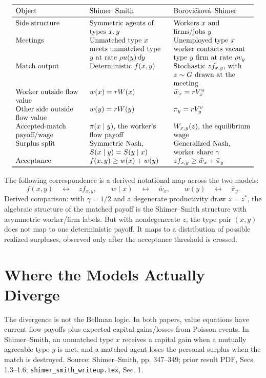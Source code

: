 \documentclass[11pt]{article}
\begin{document}
\[
\begin{array}{>{\raggedright\arraybackslash}p{0.27\linewidth}
                >{\raggedright\arraybackslash}p{0.31\linewidth}
                >{\raggedright\arraybackslash}p{0.31\linewidth}}
\toprule
Object & Shimer--Smith & Borovi\v{c}kov\'a--Shimer \\
\midrule
Side structure & Symmetric agents of types $x,y$ & Workers $x$ and firms/jobs $y$ \\
Meetings & Unmatched type $x$ meets unmatched type $y$ at rate
$\rho u(y)\,dy$ & Unemployed type $x$ worker contacts vacant type $y$ firm at
rate $\rho v_y$ \\
Match output & Deterministic $f(x,y)$ & Stochastic $z f_{x,y}$, with $z\sim G$ drawn at the meeting \\
Worker outside flow value & $w(x)=rW(x)$ & $\bar w_x=rV_x^u$ \\
Other side outside flow value & $w(y)=rW(y)$ & $\bar\pi_y=rV_y^v$ \\
Accepted-match payoff/wage & $\pi(x\mid y)$, the worker's flow payoff & $W_{x,y}(z)$, the equilibrium wage \\
Surplus split & Symmetric Nash, $S(x\mid y)=S(y\mid x)$ & Generalized Nash, worker share $\gamma$ \\
Acceptance & $f(x,y)\geq w(x)+w(y)$ & $z f_{x,y}\geq \bar w_x+\bar\pi_y$ \\
\bottomrule
\end{array}
\]

The following correspondence is a derived notational map across the two models:
\[
f(x,y)
\quad\longleftrightarrow\quad
z f_{x,y},
\qquad
w(x)
\quad\longleftrightarrow\quad
\bar w_x,
\qquad
w(y)
\quad\longleftrightarrow\quad
\bar\pi_y.
\]
Derived comparison: with $\gamma=1/2$ and a degenerate productivity draw $z=z^\ast$, the algebraic
structure of the matched payoff is the Shimer--Smith structure with asymmetric
worker/firm labels. But with nondegenerate $z$, the type pair $(x,y)$ does not
map to one deterministic payoff. It maps to a distribution of possible realized
surpluses, observed only after the acceptance threshold is crossed.

\section{Where the Models Actually Diverge}

The divergence is not the Bellman logic. In both papers, value equations have
current flow payoffs plus expected capital gains/losses from Poisson events. In
Shimer--Smith, an unmatched type $x$ receives a capital gain when a mutually
agreeable type $y$ is met, and a matched agent loses the personal surplus when
the match is destroyed. Source: Shimer--Smith, pp. 347--349; prior result PDF,
Secs. 1.3--1.6; \texttt{shimer\_smith\_writeup.tex}, Sec. 1.
\end{document}

